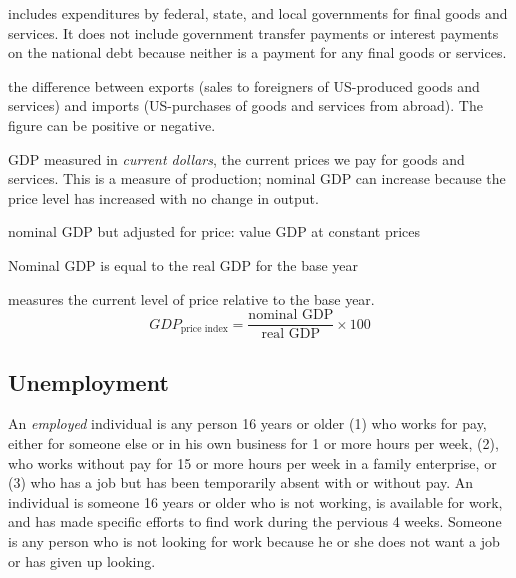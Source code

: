 \documentclass{article}
\begin{document}
\begin{definition}
  includes expenditures by federal, state, and local governments for final goods and services. It does not include government transfer payments or interest payments on the national debt because neither is a payment for any final goods or services. 
\end{definition}

\begin{definition}
  the difference between exports (sales to foreigners of US-produced goods and services) and imports (US-purchases of goods and services from abroad). The figure can be positive or negative. 
\end{definition}

\begin{definition}
  GDP measured in \emph{current dollars}, the current prices we pay for goods and services. This is  a  measure of production; nominal GDP can increase because the price level has increased with no change in output.
\end{definition}

\begin{definition}
  nominal GDP but adjusted for price: value GDP at constant prices
\end{definition}

\begin{remark}
  Nominal GDP is equal to the real GDP for the base year
\end{remark}

\begin{definition}
  measures the current level of price relative to the base year. $$GDP_{\textrm{price index}} = \frac{\textrm{nominal GDP}}{\textrm{real GDP}} \times 100$$
\end{definition}

\subsection{Unemployment}

An \emph{employed} individual is any person 16 years or older (1) who works for pay, either for someone else or in his own business for 1 or more hours per week, (2), who works without pay for 15 or more hours per week in a family enterprise, or (3) who has a job but has been temporarily absent with or without pay. An  individual is someone 16 years or older who is not working, is available for work, and has made specific efforts to find work during the pervious 4 weeks. Someone  is any person who is not looking for work because he or she does not want a job or has given up looking. \\ 
\end{document}
